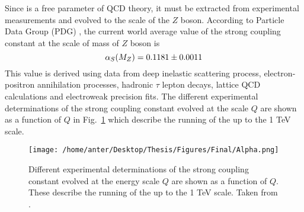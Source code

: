 Since \alps is a free parameter of QCD theory, it must be extracted from experimental measurements and evolved to the scale of the $Z$ boson. According to Particle Data Group (PDG) \cite{Patrignani:2016xqp}, the current world average value of the strong coupling constant at the scale of mass of $Z$ boson is 
\begin{equation}
\alpha_S(M_Z) = 0.1181 \pm 0.0011
\end{equation}
This value is derived using data from deep inelastic scattering process, electron-positron annihilation processes, hadronic $\tau$ lepton decays, lattice QCD calculations and electroweak precision fits. The different experimental determinations of the strong coupling constant evolved at the scale $Q$ are shown as a function of $Q$ in Fig.~\ref{fig:alpha_pdg} which describe the running of the \alps up to the 1 TeV scale.
\vspace*{2mm}
\begin{figure}[!h]
\begin{center}
\hspace*{-7mm}
\texttt{[image: /home/anter/Desktop/Thesis/Figures/Final/Alpha.png]}\\
\vspace*{4mm}
\caption[Running of the strong coupling constant evolved at the energy scale $Q$ as a function of $Q$.]{Different experimental determinations of the strong coupling constant \alps evolved at the energy scale $Q$ are shown as a function of $Q$. These describe the running of the \alps up to the 1 TeV scale. Taken from \cite{Patrignani:2016xqp}.}
\label{fig:alpha_pdg}
\end{center}
\end{figure}

